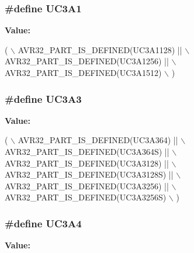 \hypertarget{group__uc3__part__macros__group_gacbe47eb7ac7d6e655d45657bffab3af6}{
\subsubsection[{U\-C3\-A1}]{\setlength{\rightskip}{0pt plus 5cm}\#define U\-C3\-A1}}\label{group__uc3__part__macros__group_gacbe47eb7ac7d6e655d45657bffab3af6}
{\bfseries Value\-:}
\begin{DoxyCode}
(       \(\backslash\)
                AVR32\_PART\_IS\_DEFINED(UC3A1128) || \(\backslash\)
                AVR32\_PART\_IS\_DEFINED(UC3A1256) || \(\backslash\)
                AVR32\_PART\_IS\_DEFINED(UC3A1512) \(\backslash\)
                )
\end{DoxyCode}
\hypertarget{group__uc3__part__macros__group_gae08aa32db9bd4a60a8cfa222f7ff74cc}{
\subsubsection[{U\-C3\-A3}]{\setlength{\rightskip}{0pt plus 5cm}\#define U\-C3\-A3}}\label{group__uc3__part__macros__group_gae08aa32db9bd4a60a8cfa222f7ff74cc}
{\bfseries Value\-:}
\begin{DoxyCode}
(       \(\backslash\)
                AVR32\_PART\_IS\_DEFINED(UC3A364)   || \(\backslash\)
                AVR32\_PART\_IS\_DEFINED(UC3A364S)  || \(\backslash\)
                AVR32\_PART\_IS\_DEFINED(UC3A3128)  || \(\backslash\)
                AVR32\_PART\_IS\_DEFINED(UC3A3128S) || \(\backslash\)
                AVR32\_PART\_IS\_DEFINED(UC3A3256)  || \(\backslash\)
                AVR32\_PART\_IS\_DEFINED(UC3A3256S) \(\backslash\)
                )
\end{DoxyCode}
\hypertarget{group__uc3__part__macros__group_ga633294c4776386c15ab2050644e77b4f}{
\subsubsection[{U\-C3\-A4}]{\setlength{\rightskip}{0pt plus 5cm}\#define U\-C3\-A4}}\label{group__uc3__part__macros__group_ga633294c4776386c15ab2050644e77b4f}
{\bfseries Value\-:}
